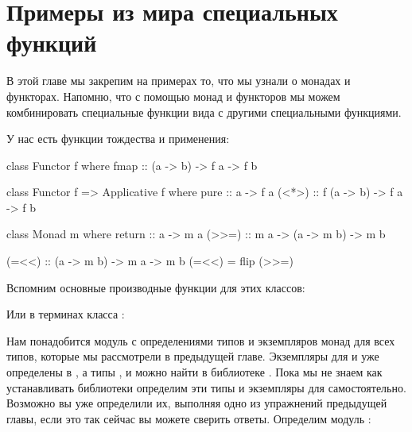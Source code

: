 \setcounter{chapter}{6}
\chapter{Примеры из мира специальных функций}

В этой главе мы закрепим на примерах то, что мы 
узнали о монадах и функторах. Напомню, что 
с помощью монад и функторов мы можем комбинировать 
специальные функции вида 
с другими специальными функциями.

У нас есть функции тождества и применения:

\begin{code}
class Functor f where
    fmap :: (a -> b) -> f a -> f b

class Functor f => Applicative f where
    pure    :: a -> f a
    (<*>)   :: f (a -> b) -> f a -> f b

class Monad m where
    return  :: a -> m a
    (>>=)   :: m a -> (a -> m b) -> m b

(=<<) :: (a -> m b) -> m a -> m b
(=<<) = flip (>>=)
\end{code}

Вспомним основные производные функции для этих классов:

Или в терминах класса :


Нам понадобится модуль с определениями типов и 
экземпляров монад для всех типов, которые мы рассмотрели
в предыдущей главе. Экземпляры для \In{[]} и 
уже определены в , а типы , 
 и  можно найти в библиотеке
. Пока мы не знаем как устанавливать библиотеки
определим эти типы и экземпляры для  
самостоятельно. Возможно вы уже определили их, выполняя
одно из упражнений предыдущей главы, если это
так сейчас вы можете сверить ответы. Определим 
модуль :


